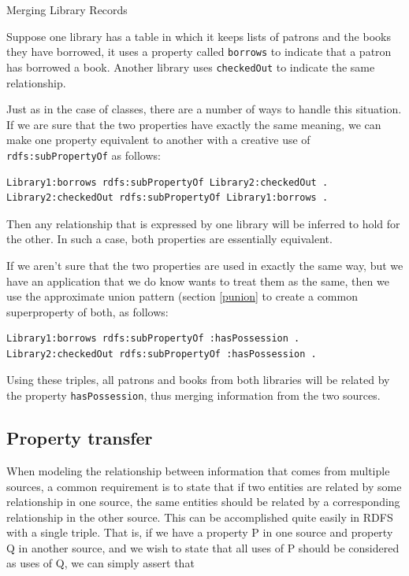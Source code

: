 \begin{example}{Merging Library Records}
\label{ex:ch8.1}

Suppose one library has a table in which it keeps lists of patrons and
the books they have borrowed, it uses a property called \texttt{borrows} to
indicate that a patron has borrowed a book. Another library uses
\texttt{checkedOut} to indicate the same relationship.

Just as in the case of classes, there are a number of ways to handle
this situation. If we are sure that the two
properties have exactly the same meaning, we can make one property
equivalent to another with a creative use of \texttt{rdfs:subPropertyOf} as
follows:

\begin{lstlisting}
Library1:borrows rdfs:subPropertyOf Library2:checkedOut .
Library2:checkedOut rdfs:subPropertyOf Library1:borrows .
\end{lstlisting}

Then any relationship that is expressed by one library will be inferred
to hold for the other. In such a case, both properties are essentially
equivalent.

If we aren't sure that the two properties are used in exactly the same
way, but we have an application that
we do know wants to treat them as the same, then we use the approximate union
pattern (section \ref{punion} to create a common superproperty of both, as follows:

\begin{lstlisting}
Library1:borrows rdfs:subPropertyOf :hasPossession .
Library2:checkedOut rdfs:subPropertyOf :hasPossession .
\end{lstlisting}

Using these triples, all patrons and books from both libraries will be
related by the property \texttt{hasPossession}, thus merging information from the
two sources.
\end{example}

\subsection{Property transfer}

When modeling the relationship between information that comes from
multiple sources, a common requirement is to state that if two entities
are related by some relationship in one source, the same entities should
be related by a corresponding relationship in the other source. This can
be accomplished quite easily in RDFS with a single triple. That is, if
we have a property P in one source and property Q in another source, and
we wish to state that all uses of P should be considered as uses of Q,
we can simply assert that

